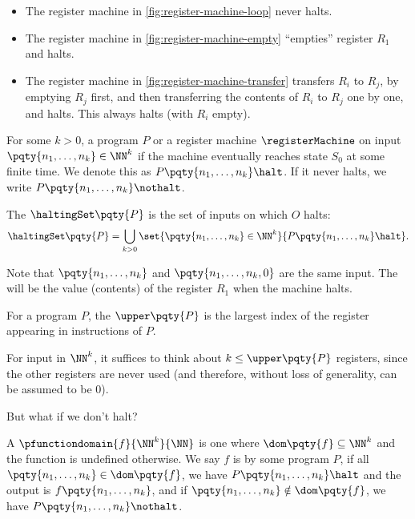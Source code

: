 \begin{example*}
    \begin{itemize}
        \item The register machine in \autoref{fig:register-machine-loop} never halts.
        \item The register machine in \autoref{fig:register-machine-empty} ``empties'' register \(R_1\) and halts.
        \item The register machine in \autoref{fig:register-machine-transfer} transfers \(R_i\) to \(R_j\), by emptying \(R_j\) first, and then transferring the contents of \(R_i\) to \(R_j\) one by one, and halts. This always halts (with \(R_i\) empty).
    \end{itemize}
\end{example*}

\begin{definition}
    For some \(k > 0\), a program \(P\) or a register machine \(\registerMachine\)  on input \(\pqty{n_1, \ldots, n_k} \in \NN^k\) if the machine eventually reaches state \(S_0\) at some finite time. We denote this as \(P\pqty{n_1, \ldots, n_k} \halt\). If it never halts, we write \(P\pqty{n_1, \ldots, n_k} \nothalt\).

    The  \(\haltingSet\pqty{P}\) is the set of inputs on which \(O\) halts:
    \[
        \haltingSet\pqty{P} = \bigcup_{k > 0} \set{\pqty{n_1, \ldots, n_k} \in \NN^k}{P\pqty{n_1, \ldots, n_k} \halt}.
    \]

    Note that \(\pqty{n_1, \ldots, n_k}\) and \(\pqty{n_1, \ldots, n_k, 0}\) are the same input. The  will be the value (contents) of the register \(R_1\) when the machine halts.
\end{definition}

\begin{definition}
    For a program \(P\), the  \(\upper\pqty{P}\) is the largest index of the register appearing in instructions of \(P\).
\end{definition}

For input in \(\NN^k\), it suffices to think about \(k \leq \upper\pqty{P}\) registers, since the other registers are never used (and therefore, without loss of generality, can be assumed to be \(0\)).

But what if we don't halt?

\begin{definition}
    A  \(\pfunctiondomain{f}{\NN^k}{\NN}\) is one where \(\dom\pqty{f} \subseteq \NN^k\) and the function is undefined otherwise. We say \(f\) is  by some program \(P\), if all \(\pqty{n_1, \ldots, n_k} \in \dom\pqty{f}\), we have \(P\pqty{n_1, \ldots, n_k} \halt\) and the output is \(f\pqty{n_1, \ldots, n_k}\), and if \(\pqty{n_1, \ldots, n_k} \notin \dom\pqty{f}\), we have \(P\pqty{n_1, \ldots, n_k} \nothalt\).

\end{definition}

